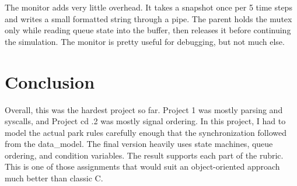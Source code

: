 \documentclass[12pt]{article}
\begin{document}
The monitor adds very little overhead. It takes a snapshot once per 5 time steps and writes a small formatted string through a pipe. The parent holds the mutex only while reading queue state into the buffer, then releases it before continuing the simulation. The monitor is pretty useful for debugging, but not much else.

\section{Conclusion}
Overall, this was the hardest project so far. Project 1 was mostly parsing and syscalls, and Project cd .2 was mostly signal ordering. In this project, I had to model the actual park rules carefully enough that the synchronization followed from the data\_model. The final version heavily uses state machines, queue ordering, and condition variables. The result supports each part of the rubric. This is one of those assignments that would suit an object-oriented approach much better than classic C.
\end{document}
